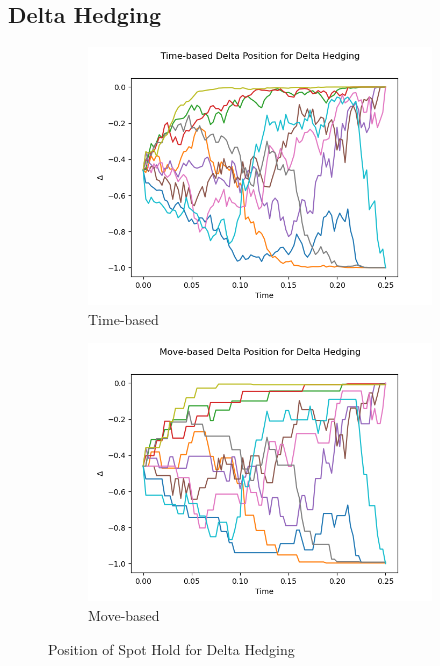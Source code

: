 \documentclass[12pt]{article}
\begin{document}
\subsection{Delta Hedging}
\begin{figure}[H]
  \centering
  \begin{subfigure}{.5\textwidth}
    \centering
    \includegraphics[width=\linewidth]{position-delta-time.png}
    \caption{Time-based}
  \end{subfigure}%
  \begin{subfigure}{.5\textwidth}
    \centering
    \includegraphics[width=\linewidth]{position-delta-move.png}
    \caption{Move-based}
  \end{subfigure}%
  \caption{Position of Spot Hold for Delta Hedging}
\end{figure}
\end{document}
